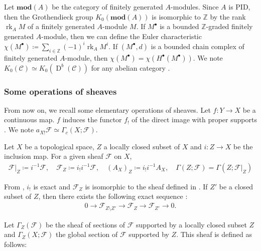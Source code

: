 \documentclass[a4paper,dvipdfmx,reqno,12pt]{amsart}
\theoremstyle{definition}
\newcommand{\deq}{\coloneqq}
\newcommand{\Z}{\mathbb{Z}}%
\newcommand{\mcal}[1]{\mathcal{#1}}%
\newcommand{\opn}[1]{\operatorname{#1}}
\newcommand{\catn}[1]{\mathbf{#1}}
\numberwithin{equation}{section}
\begin{document}
Let $\catn{mod}(A)$ be the category of 
finitely generated $A$-modules.
Since $A$ is PID, then the Grothendieck group 
$K_0(\catn{mod}(A))$ is isomorphic to $\Z$ by
the rank $\opn{rk}_A M$ of a finitely generated
$A$-module $M$.
If $M^{\bullet}$ is a bounded $\Z$-graded finitely generated $A$-module,
then we can define the Euler characteristic 
$\chi(M^{\bullet})\deq 
\sum_{i\in \Z}(-1)^{i}\opn{rk}_A M^{i}$.
If $(M^{\bullet},d)$ is a bounded chain complex of finitely 
generated $A$-module, then 
$\chi(M^{\bullet})=\chi(H^{\bullet}(M^{\bullet}))$.
We note $K_0(\mathcal{C})\simeq 
K_0(\opn{D}^{b}(\mathcal{C}))$ for any abelian category 
\cite[Exercise I.27]{MR1299726}.

\subsubsection{Some operations of sheaves}

From now on, we recall some elementary 
operations of sheaves. 
Let $f\colon Y\to X$ be a continuous map.
$f$ induces the functor $f_!$ of
the direct image with proper supports 
\cite[(2.5.1)]{MR1299726}. 
We note $a_{X!}\mathcal{F}\simeq \Gamma_c(X;\mathcal{F})$.

Let $X$ be a topological space, $Z$ a locally closed 
subset of $X$
and $i\colon Z\to X$ be the inclusion map.
For a given sheaf $\mathcal{F}$ on $X$, 
\begin{align}
\mcal{F}|_{Z}\deq i^{-1}\mcal{F}, \quad 
\mcal{F}_Z\deq i_! i^{-1}\mcal{F}, \quad 
(A_X)_Z\deq i_!i^{-1}A_X, \quad \Gamma(Z;\mathcal{F})=\Gamma(Z;\mathcal{F}|_{Z})
\end{align}

From \cite[Proposition 2.5.4]{MR1299726}, $i_!$ is exact 
and $\mcal{F}_Z$ is isomorphic to the sheaf defined in
\cite[p.93]{MR1299726}.
If $Z'$ be a closed subset of $Z$, then
there exists the following exact sequence 
\cite[Proposition 2.3.6.(v)]{MR1299726}:
\begin{align}
0\to \mathcal{F}_{Z\setminus Z'} \to 
\mathcal{F}_Z \to \mathcal{F}_{Z'}\to 0.
\end{align}

Let $\Gamma_{Z}(\mcal{F})$ be the sheaf of sections of 
$\mcal{F}$ supported by a locally closed subset $Z$
\cite[Definition 2.3.8]{MR1299726} and 
$\Gamma_{Z}(X;\mcal{F})$ the global section of 
$\mathcal{F}$ supported by $Z$.
This sheaf is defined as follows:
\end{document}
